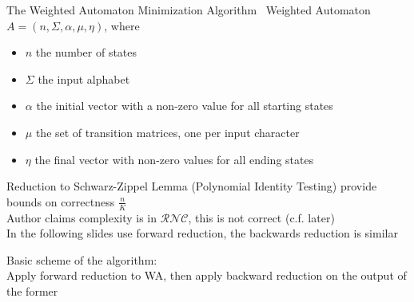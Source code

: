 \documentclass[rgb, pdf]{beamer}
\begin{document}
    \begin{frame}[allowframebreaks]{The Weighted Automaton Minimization Algorithm~\autocite{Kiefer2013OnTC}}
        Weighted Automaton $A = \left( n, \Sigma, \alpha, \mu, \eta \right)$, where
        \begin{itemize}
            \item $n$ the number of states
            \item $\Sigma$ the input alphabet
            \item $\alpha$ the initial vector with a non-zero value for all starting states
            \item $\mu$ the set of transition matrices, one per input character
            \item $\eta$ the final vector with non-zero values for all ending states
        \end{itemize}
        \vspace{7cm}
        Reduction to Schwarz-Zippel Lemma (Polynomial Identity Testing) provide bounds on correctness $\frac{n}{K}$\\ \vspace{0.5cm}
        Author claims complexity is in $\mathcal{RNC}$, this is not correct (c.f. later) \\ \vspace{0.5cm}
        In the following slides use forward reduction, the backwards reduction is similar \\ \vspace{2cm}
        
        Basic scheme of the algorithm: \\
        Apply forward reduction to WA, then apply backward reduction on the output of the former
        \framebreak
        

\end{frame}
\end{document}

